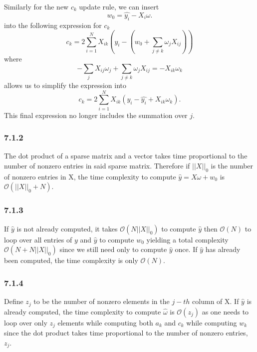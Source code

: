 \documentclass[12pt]{amsart}
\begin{document}
Similarly for the new $c_k$ update rule, we can insert
\begin{equation}
w_0 = \hat{y_i} - X_i \omega.
\end{equation}
into the following expression for $c_k$
\begin{equation}
c_k = 2 \sum_{i=1}^N X_{ik}(y_i - (w_0 + \sum_{j \neq k}\omega_j X_{ij}))
\end{equation}
where 
\begin{equation}
-\sum_j X_{ij}\omega_j + \sum_{j \neq k}\omega_j X_{ij} = -X_{ik}\omega_k
\end{equation}
allows us to simplify the expression into 
\begin{equation}
c_k = 2 \sum_{i=1}^N X_{ik}(y_i - \hat{y_i} + X_{ik}\omega_k).
\end{equation}
This final expression no longer includes the summation over $j$.

\subsubsection*{7.1.2}
The dot product of a sparse matrix and a vector takes time proportional to the number of nonzero entries in said sparse matrix.  Therefore if $||X||_0$ is the number of nonzero entries in X, the time complexity to compute $\hat{y} = X\omega + w_0$ is $\mathcal{O}(||X||_0 + N)$.

\subsubsection*{7.1.3}

If $\hat{y}$ is not already computed, it takes $\mathcal{O}(N ||X||_0)$ to compute $\hat{y}$ then $\mathcal{O}(N)$ to loop over all entries of $y$ and $\hat{y}$ to compute $w_0$ yielding a total complexity $\mathcal{O}(N + N||X||_0)$ since we still need only to compute $\hat{y}$ once.  If $\hat{y}$ has already been computed, the time complexity is only $\mathcal{O}(N)$. 

\subsubsection*{7.1.4}

Define $z_j$ to be the number of nonzero elements in the $j-th$ column of X.  If $\hat{y}$ is already computed, the time complexity to compute $\hat{\omega}$ is $\mathcal{O}(z_j)$ as one needs to loop over only $z_j$ elements while computing both $a_k$ and $c_k$ while computing $w_k$ since the dot product takes time proportional to the number of nonzero entries, $z_j$.
\end{document}
